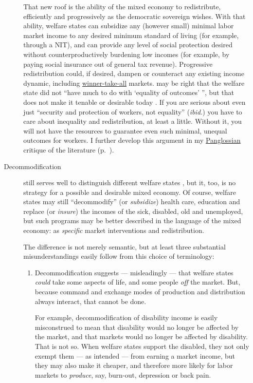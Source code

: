 \begin{description}
	That new roof is the ability of the mixed economy to redistribute, efficiently and progressively as the democratic sovereign wishes.
With that ability, welfare states can subsidize any (however small) minimal labor market income to any desired minimum standard of living (for example, through a \gls{NIT}), and can provide any level of social protection desired without counterproductively burdening low incomes (for example, by paying social insurance out of general tax revenue).
Progressive redistribution could, if desired, dampen or counteract any existing income dynamic, including \hyperref[sec:winner-take-all]{winner-take-all} markets.
\citeauthor{Offe2003} may be right that the welfare state did not ``have much to do with `equality of outcomes' '', but that does not make it tenable or desirable today \citeyearpar[450]{Offe2003}.
If you are serious about even just ``security and protection of workers, not equality'' (\emph{ibid.}) you have to care about inequality and redistribution, at least a little.
Without it, you will not have the resources to guarantee even such minimal, unequal outcomes for workers.
I further develop this argument  in my \hyperref[sec:Pangloss]{Panglossian} critique of the literature (p.~\pageref{sec:Pangloss}).

	\item[Decommodification] still serves well to distinguish different welfare states \citep{Esping-Andersen-1990-aa}, but it, too, is no strategy for a possible and desirable mixed economy.
 Of course, welfare states may still ``decommodify'' (or \emph{subsidize}) health care, education and replace (or \emph{insure}) the incomes of the sick, disabled, old and unemployed, but such programs may be better described in the language of the mixed economy:
as \emph{specific} market interventions and redistribution.

	The difference is not merely semantic, but at least three substantial misunderstandings easily follow from this choice of terminology:
	\begin{enumerate}
		\item Decommodification suggests --- misleadingly --- that welfare states \emph{could} take some aspects of life, and some people \emph{off} the market.
But, because command and exchange modes of production and distribution always interact, that cannot be done.

		For example, decommodification of disability income is easily misconstrued to mean that disability would no longer be affected by the market, and that markets would no longer be affected by disability.
That is not so.
When welfare states support the disabled, they not only exempt them --- as intended --- from earning a market income, but they may also make it cheaper, and therefore more likely for labor markets to \emph{produce}, say, burn-out, depression or back pain.


\end{enumerate}
\end{description}
